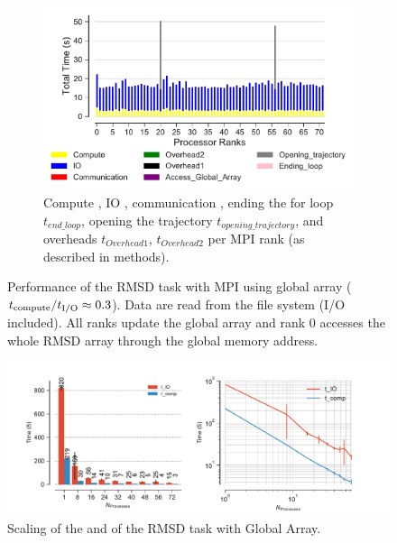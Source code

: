 \begin{figure}
\begin{subfigure} {.8\textwidth}
  \includegraphics[width=\linewidth]{figures/RMSD-ga4py-BarPlot-rank-comparison_72_1.pdf}
  \caption{Compute \tcomp, IO \tIO, communication \tcomm , ending the for loop $t_{end\_loop}$,
  opening the trajectory $t_{opening\_trajectory}$, and overheads $t_{Overhead1}$,  $t_{Overhead2}$ per MPI rank (as described in methods).}
  \label{fig:MPIranks-ga4py}
\end{subfigure}
%
\caption{Performance of the RMSD task with MPI using global array (${t}_{\text{compute}}/{t}_{\text{I/O}} \approx 0.3$).
Data are read from the file system (I/O included). All ranks update the global array and rank 0 accesses the whole RMSD array through the global memory address.}
\label{fig:MPIwithIO-ga4py}
\end{figure}

\begin{figure}
\centering
  \includegraphics[width=\linewidth]{figures/RMSD-ga4py-time_IO_comparison.pdf}
\caption{Scaling of the \tcomp and \tIO of the RMSD task with Global Array.}
\label{fig:ScalingComputeIO-ga4py}
\end{figure}

